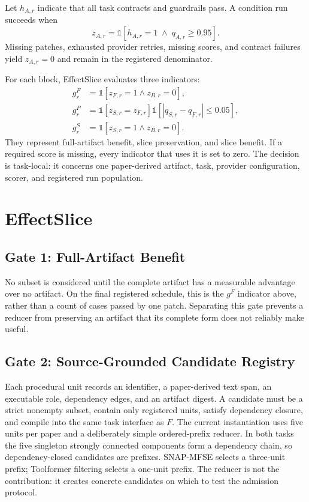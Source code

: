 \documentclass[letterpaper]{article} %
\begin{document}
Let $h_{A,r}$ indicate that all task contracts and guardrails pass.  A condition
run succeeds when
\begin{equation}
z_{A,r}=\mathbb{1}\left[h_{A,r}=1 \;\land\; q_{A,r}\geq 0.95\right].
\end{equation}
Missing patches, exhausted provider retries, missing scores, and contract
failures yield $z_{A,r}=0$ and remain in the registered denominator.

For each block, EffectSlice evaluates three indicators:
\begin{align}
g^{F}_{r} &=
  \mathbb{1}[z_{F,r}=1 \land z_{B,r}=0],\\
g^{P}_{r} &=
  \mathbb{1}[z_{S,r}=z_{F,r}]
  \mathbb{1}[|q_{S,r}-q_{F,r}|\leq 0.05],\\
g^{S}_{r} &=
  \mathbb{1}[z_{S,r}=1 \land z_{B,r}=0].
\end{align}
They represent full-artifact benefit, slice preservation, and slice benefit.
If a required score is missing, every indicator that uses it is set to zero.
The decision is task-local: it concerns one paper-derived artifact, task,
provider configuration, scorer, and registered run population.

\section{EffectSlice}

\subsection{Gate 1: Full-Artifact Benefit}

No subset is considered until the complete artifact has a measurable advantage
over no artifact.  On the final registered schedule, this is the
$g^F$ indicator above, rather than a count of cases passed by one patch.
Separating this gate prevents a reducer from preserving an artifact that its
complete form does not reliably make useful.

\subsection{Gate 2: Source-Grounded Candidate Registry}

Each procedural unit records an identifier, a paper-derived text span, an
executable role, dependency edges, and an artifact digest.  A candidate must be
a strict nonempty subset, contain only registered units, satisfy dependency
closure, and compile into the same task interface as $F$.  The current
instantiation uses five units per paper and a deliberately simple ordered-prefix
reducer.  In both tasks the five singleton strongly connected components form a
dependency chain, so dependency-closed candidates are prefixes.  SNAP-MFSE
selects a three-unit prefix; Toolformer filtering selects a
one-unit prefix.  The reducer is not the contribution: it creates concrete
candidates on which to test the admission protocol.
\end{document}
